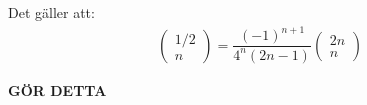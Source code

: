 \par\bigskip
\begin{lem}[10]{}
  Det gäller att:
  \begin{equation*}
    \begin{gathered}
      \begin{pmatrix}1/2\\n\end{pmatrix} = \dfrac{(-1)^{n+1}}{4^n(2n-1)}\begin{pmatrix}2n\\n\end{pmatrix}
    \end{gathered}
  \end{equation*}
\end{lem}
\par\bigskip
\begin{prf}[]{}
  \textbf{GÖR DETTA}
\end{prf}
\par\bigskip
